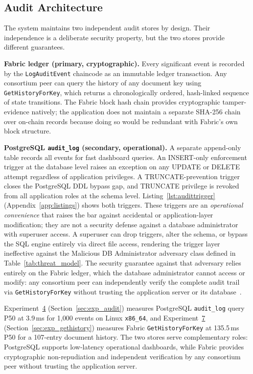 \documentclass[preprint,12pt]{elsarticle}
\begin{document}
\subsection{Audit Architecture}
\label{sec:audit}

The system maintains two independent audit stores by design. Their
independence is a deliberate security property, but the two stores
provide different guarantees.

\textbf{Fabric ledger (primary, cryptographic).} Every significant
event is recorded by the \texttt{LogAuditEvent} chaincode as an
immutable ledger transaction. Any consortium peer can query the
history of any document key using \texttt{GetHistoryForKey}, which
returns a chronologically ordered, hash-linked sequence of state
transitions. The Fabric block hash chain provides cryptographic
tamper-evidence natively; the application does not maintain a
separate SHA-256 chain over on-chain records because doing so would
be redundant with Fabric's own block structure.

\textbf{PostgreSQL \texttt{audit\_log} (secondary, operational).}
A separate append-only table records all events for fast dashboard
queries. An INSERT-only enforcement trigger at the database level
raises an exception on any UPDATE or DELETE attempt regardless of
application privileges. A TRUNCATE-prevention trigger closes the
PostgreSQL DDL bypass gap, and TRUNCATE privilege is revoked from
all application roles at the schema level.
Listing~\ref{lst:audittrigger} (Appendix~\ref{app:listings}) shows both triggers. These triggers
are an \emph{operational convenience} that raises the bar against
accidental or application-layer modification; they are not a
security defense against a database administrator with superuser
access. A superuser can drop triggers, alter the schema, or bypass
the SQL engine entirely via direct file access, rendering the
trigger layer ineffective against the Malicious DB Administrator
adversary class defined in Table~\ref{tab:threat_model}. The
security guarantee against that adversary relies entirely on the
Fabric ledger, which the database administrator cannot access or
modify: any consortium peer can independently verify the complete
audit trail via \texttt{GetHistoryForKey} without trusting the
application server or its database~\cite{androulaki2018hyperledger}.



Experiment~\hyperref[sec:exp_audit]{4} (Section~\ref{sec:exp_audit}) measures PostgreSQL
\texttt{audit\_log} query P50 at 3.9\,ms for 1,000 events on Linux
\texttt{x86\_64}, and Experiment~\hyperref[sec:exp_gethistory]{7}
(Section~\ref{sec:exp_gethistory}) measures Fabric
\texttt{GetHistoryForKey} at 135.5\,ms P50 for a 107-entry document
history. The two stores serve complementary roles: PostgreSQL supports
low-latency operational dashboards, while Fabric provides
cryptographic non-repudiation and independent verification by any
consortium peer without trusting the application server.
\end{document}
